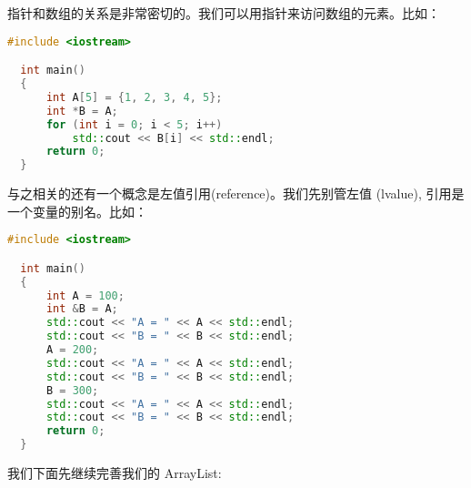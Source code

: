 \documentclass[a4paper]{ctexart}
\theoremstyle{definition}
\theoremstyle{definition}
\begin{document}
指针和数组的关系是非常密切的。我们可以用指针来访问数组的元素。比如：

\begin{lstlisting}[language=C++]
  #include <iostream>

  int main()
  {
      int A[5] = {1, 2, 3, 4, 5};
      int *B = A;
      for (int i = 0; i < 5; i++)
          std::cout << B[i] << std::endl;
      return 0;
  }
\end{lstlisting}

与之相关的还有一个概念是左值引用(reference)。我们先别管左值 (lvalue), 引用是一个变量的别名。比如：

\begin{lstlisting}[language=C++]
  #include <iostream>

  int main()
  {
      int A = 100;
      int &B = A;
      std::cout << "A = " << A << std::endl;
      std::cout << "B = " << B << std::endl;
      A = 200;
      std::cout << "A = " << A << std::endl;
      std::cout << "B = " << B << std::endl;
      B = 300;
      std::cout << "A = " << A << std::endl;
      std::cout << "B = " << B << std::endl;
      return 0;
  }
\end{lstlisting}

我们下面先继续完善我们的 ArrayList:
\end{document}
